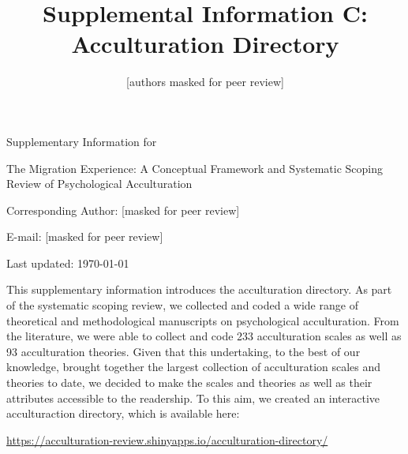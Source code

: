 \documentclass[man, 12pt, a4paper]{apa7}
\title{Supplemental Information C: Acculturation Directory}
\author{[authors masked for peer review]}
\begin{document}
\begin{titlepage}
	{\noindent\Large Supplementary Information for \par}
	\vspace{0.5cm}
	{\noindent\Large The Migration Experience: A Conceptual Framework and Systematic Scoping Review of Psychological Acculturation\par}
	\vspace{1.5cm}
	{\noindent\LARGE\bfseries \thetitle \par}
	\vspace{2cm}
	{\noindent\Large\itshape \theauthor \par}
	\vfill
	\noindent Corresponding Author: [masked for peer review]\par
	\noindent E-mail: [masked for peer review]\par
	\vfill

	{\noindent Last updated: \today\par}
\end{titlepage}

\begin{center}
   \textbf{\thetitle} 
\end{center}

This supplementary information introduces the acculturation directory. As part of the systematic scoping review, we collected and coded a wide range of theoretical and methodological manuscripts on psychological acculturation. From the literature, we were able to collect and code 233 acculturation scales as well as 93 acculturation theories. Given that this undertaking, to the best of our knowledge, brought together the largest collection of acculturation scales and theories to date, we decided to make the scales and theories as well as their attributes accessible to the readership. To this aim, we created an interactive acculturaction directory, which is available here:

\vspace{.5cm}
\begin{tcolorbox}
    \vspace{0.2cm} \centering 
    \href{https://acculturation-review.shinyapps.io/acculturation-directory/}{https://acculturation-review.shinyapps.io/acculturation-directory/}
    \vspace{0.2cm} 
\end{tcolorbox}
\end{document}
